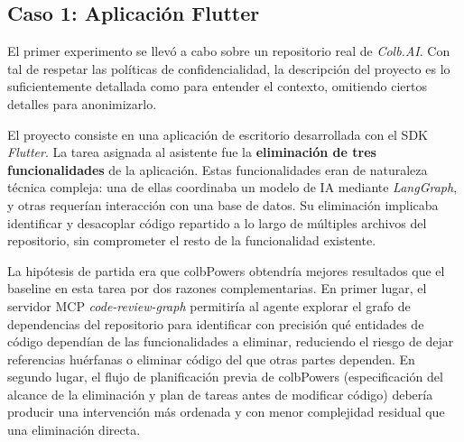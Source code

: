 \documentclass[11pt, letterpaper]{article}
\begin{document}
\subsection{Caso 1: Aplicación Flutter}
\label{sec:caso1_confortmental}
El primer experimento se llevó a cabo sobre un repositorio real de \textit{Colb.AI}. Con tal de respetar las políticas de confidencialidad, la descripción del proyecto es lo suficientemente detallada como para entender el contexto, omitiendo ciertos detalles para anonimizarlo.

El proyecto consiste en una aplicación de escritorio desarrollada con el SDK \textit{Flutter}. La tarea asignada al asistente fue la \textbf{eliminación de tres funcionalidades} de la aplicación. Estas funcionalidades eran de naturaleza técnica compleja: una de ellas coordinaba un modelo de IA mediante \textit{LangGraph}, y otras requerían interacción con una base de datos. Su eliminación implicaba identificar y desacoplar código repartido a lo largo de múltiples archivos del repositorio, sin comprometer el resto de la funcionalidad existente.

La hipótesis de partida era que colbPowers obtendría mejores resultados que el baseline en esta tarea por dos razones complementarias. En primer lugar, el servidor MCP \textit{code-review-graph} permitiría al agente explorar el grafo de dependencias del repositorio para identificar con precisión qué entidades de código dependían de las funcionalidades a eliminar, reduciendo el riesgo de dejar referencias huérfanas o eliminar código del que otras partes dependen. En segundo lugar, el flujo de planificación previa de colbPowers (especificación del alcance de la eliminación y plan de tareas antes de modificar código) debería producir una intervención más ordenada y con menor complejidad residual que una eliminación directa.
\end{document}
